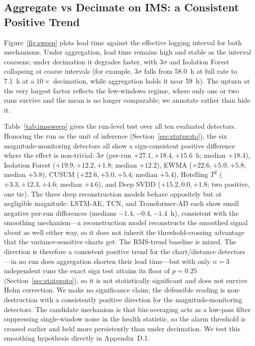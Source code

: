 \documentclass[IJPHM, 2026, 0]{PHMSociety}
\begin{document}
\subsection{Aggregate vs Decimate on IMS: a Consistent Positive Trend}
Figure~\ref{fig:sweep} plots lead time against the effective logging interval for both mechanisms. Under aggregation, lead time remains high and stable as the interval coarsens; under decimation it degrades faster, with $3\sigma$ and Isolation Forest collapsing at coarse intervals (for example, $3\sigma$ falls from 58.0~h at full rate to 7.1~h at a $10\times$ decimation, while aggregation holds it near 59~h). The upturn at the very largest factor reflects the few-windows regime, where only one or two runs survive and the mean is no longer comparable; we annotate rather than hide it.

Table~\ref{tab:imssweep} gives the run-level test over all ten evaluated detectors. Honoring the run as the unit of inference (Section~\ref{sec:statproto}), the six magnitude-monitoring detectors all show a sign-consistent positive difference where the effect is non-trivial: $3\sigma$ (per-run $+27.1, +18.4, +15.6$~h; median $+18.4$), Isolation Forest ($+19.9, +12.2, +1.8$; median $+12.2$), EWMA ($+22.6, +5.0, +5.8$; median $+5.8$), CUSUM ($+22.6, +5.0, +5.4$; median $+5.4$), Hotelling $T^2$ ($+3.3, +12.3, +4.6$; median $+4.6$), and Deep SVDD ($+15.2, 0.0, +1.8$; two positive, one tie). The three deep reconstruction models behave oppositely but at negligible magnitude: LSTM-AE, TCN, and Transformer-AD each show small negative per-run differences (medians $-1.4, -0.4, -1.4$~h), consistent with the smoothing mechanism---a reconstruction model reconstructs the smoothed signal about as well either way, so it does not inherit the threshold-crossing advantage that the variance-sensitive charts get. The RMS-trend baseline is mixed. The direction is therefore a consistent positive trend for the chart/distance detectors---in no run does aggregation shorten their lead time---but with only $n=3$ independent runs the exact sign test attains its floor of $p=0.25$ (Section~\ref{sec:statproto}), so it is not statistically significant and does not survive Holm correction. We make no significance claim; the defensible reading is non-destruction with a consistently positive direction for the magnitude-monitoring detectors. The candidate mechanism is that bin-averaging acts as a low-pass filter suppressing single-window noise in the health statistic, so the alarm threshold is crossed earlier and held more persistently than under decimation. We test this smoothing hypothesis directly in Appendix~D.1.
\end{document}
